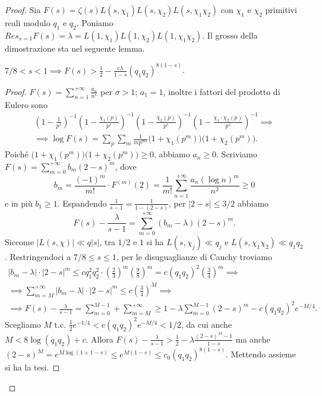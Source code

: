 \begin{proof}
  Sia $F(s)=\zeta(s)L(s,\chi_1)L(s,\chi_2)L(s,\chi_1\chi_2)$ con $\chi_1$ e $\chi_2$ primitivi reali modulo $q_1$ e $q_2$. Poniamo $\displaystyle Res_{s=1}F(s)=\lambda=L(1,\chi_1)L(1,\chi_2)L(1,\chi_1\chi_2)$. Il grosso della dimostrazione sta nel seguente lemma.
  \begin{lm}
    $7/8<s<1 \implies F(s)>\frac{1}{2}-\frac{c\lambda}{1-s}(q_1q_2)^{8(1-s)}$.
  \end{lm}
  \begin{proof}
    $\displaystyle F(s)=\sum_{n=1}^{+\infty} \frac{a_n}{n^s}$ per $\sigma>1$; $a_1=1$, inoltre i fattori del prodotto di Eulero sono
    \begin{gather*}
      \left(1-\frac{1}{p^s}\right)^{-1}\left(1-\frac{\chi_1(p)}{p^s}\right)^{-1}\left(1-\frac{\chi_2(p)}{p^s}\right)^{-1}\left(1-\frac{\chi_1\cdot\chi_2(p)}{p^s}\right)^{-1} \implies \\
      \implies \log{F(s)}=\sum_p\sum_m \frac{1}{mp^{ms}} \big(1+\chi_1(p^m)\big)\big(1+\chi_2(p^m)\big).
    \end{gather*}
    Poiché $\big(1+\chi_1(p^m)\big)\big(1+\chi_2(p^m)\big) \ge 0$, abbiamo $a_n \ge 0$. Scriviamo $\displaystyle F(s)=\sum_{m=0}^{+\infty} b_m(2-s)^m$, dove
    $$b_m=\frac{(-1)^m}{m!}\cdot F^{(m)}(2)=\frac{1}{m!}\sum_{n=1}^{+\infty} \frac{a_n(\log{n})^m}{n^2} \ge 0$$
    e in più $b_1 \ge 1$. Espandendo $\frac{1}{s-1}=\frac{1}{1-(2-s)}$, per $|2-s| \le 3/2$ abbiamo
    $$F(s)-\frac{\lambda}{s-1}=\sum_{m=0}^{+\infty} (b_m-\lambda)(2-s)^m.$$
    Siccome $|L(s,\chi)| \ll q|s|$, tra $1/2$ e $1$ si ha $L(s,\chi_j) \ll q_j$ e $L(s,\chi_1\chi_2) \ll q_1q_2$. Restringendoci a $7/8 \le s \le 1$, per le disuguaglianze di Cauchy troviamo
    \begin{gather*}
      |b_m-\lambda|\cdot|2-s|^m \le cq_1^2q_2^2\cdot\left(\frac{2}{3}\right)^m\left(\frac{9}{8}\right)^m=c(q_1q_2)^2\left(\frac{3}{4}\right)^m \implies \\
      \implies \sum_{m=M}^{+\infty} |b_m-\lambda|\cdot|2-s|^m \le c\left(\frac{3}{4}\right)^M \implies \\
      \implies F(s)-\frac{\lambda}{s-1}=\sum_{m=0}^{M-1}+\sum_{m=M}^{+\infty} \ge 1-\lambda\sum_{m=0}^{M-1}(2-s)^m-c(q_1q_2)^2e^{-M/4}.
    \end{gather*}
    Scegliamo $M$ t.c. $\frac{1}{2}e^{-1/4}<c(q_1q_2)^2e^{-M/4}<1/2$, da cui anche $M<8\log(q_1q_2)+c$. Allora $F(s)-\frac{\lambda}{s-1}>\frac{1}{2}-\lambda\frac{(2-s)^M-1}{1-s}$ ma anche $(2-s)^M=e^{M\log(1+1-s)} \le e^{M(1-s)} \le c_0(q_1q_2)^{8(1-s)}$. Mettendo assieme si ha la tesi.

\end{proof}
\end{proof}
